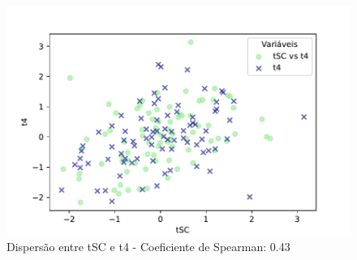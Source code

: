 \begin{figure}[h]
\begin{minipage}[b]{0.45\linewidth}
        \vspace{0.3cm}
        \begin{minipage}{\linewidth}
            \centering
        \end{minipage}
    \end{minipage}
\end{figure}
\FloatBarrier

\begin{figure}[h]
    \captionsetup{font=footnotesize, justification=centering, labelsep=period, position=above}
    \centering
    \begin{minipage}[b]{0.45\linewidth}
        \caption{Dispersão entre tSC e t4 - Coeficiente de Spearman: 0.43}
        \label{fig:tSC-t4}
        \centering
        \includegraphics[scale=0.35]{figuras/Spearman/tSC-t4.pdf}
        \vspace{0.3cm}
        \begin{minipage}{\linewidth}
            \centering
        \end{minipage}
    \end{minipage}
    \hspace{0.05\linewidth}
    \begin{minipage}[b]{0.45\linewidth}

\end{minipage}
\end{figure}
